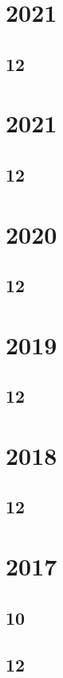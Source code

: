 \documentclass[11pt]{book}
\begin{document}
\section{2021}
\subsection{12}

\section{2021}
\subsection{12}

\section{2020}
\subsection{12}

\section{2019}
\subsection{12}





\section{2018}
\subsection{12}




\section{2017}
\subsection{10}

\subsection{12}

\end{document}
